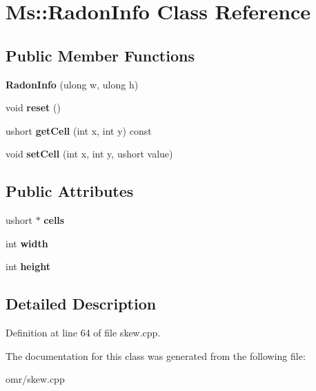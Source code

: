 \hypertarget{class_ms_1_1_radon_info}{}\section{Ms\+:\+:Radon\+Info Class Reference}
\label{class_ms_1_1_radon_info}
\subsection*{Public Member Functions}
\begin{DoxyCompactItemize}
\item 
\mbox{\label{class_ms_1_1_radon_info_a8ceaef4fefa221d882181da91f2889b9}} 
{\bfseries Radon\+Info} (ulong w, ulong h)
\item 
\mbox{\label{class_ms_1_1_radon_info_ac0fc5ea3292348fd0ce07b5854de5866}} 
void {\bfseries reset} ()
\item 
\mbox{\label{class_ms_1_1_radon_info_ad751fbfbd4fda88ba4f30a2320f1bd65}} 
ushort {\bfseries get\+Cell} (int x, int y) const
\item 
\mbox{\label{class_ms_1_1_radon_info_a83a7fc6b895aac44f5623c2b022921a2}} 
void {\bfseries set\+Cell} (int x, int y, ushort value)
\end{DoxyCompactItemize}
\subsection*{Public Attributes}
\begin{DoxyCompactItemize}
\item 
\mbox{\label{class_ms_1_1_radon_info_a40f8664fa619eb78f1914bbc86ddb612}} 
ushort $\ast$ {\bfseries cells}
\item 
\mbox{\label{class_ms_1_1_radon_info_ab50fc02b7f3841634a4afaf76e588974}} 
int {\bfseries width}
\item 
\mbox{\label{class_ms_1_1_radon_info_a5ac1cff8f7ec27d01190126aa192e90d}} 
int {\bfseries height}
\end{DoxyCompactItemize}


\subsection{Detailed Description}


Definition at line 64 of file skew.\+cpp.



The documentation for this class was generated from the following file\+:\begin{DoxyCompactItemize}
\item 
omr/skew.\+cpp\end{DoxyCompactItemize}
